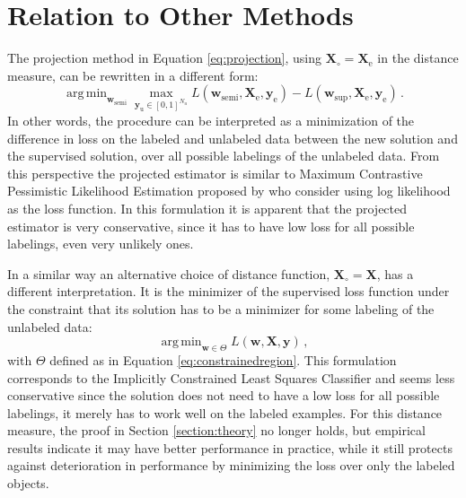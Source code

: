 \documentclass[twoside]{memoir}\usepackage[]{graphicx}\usepackage{xcolor}
\newcommand{\Xe}{\mathbf{X}_\mathrm{e}  }
\DeclareMathOperator*{\argmin}{arg\,min}
\renewcommand{\vec}{\mathbf}
\begin{document}
\section{Relation to Other Methods}
\label{section:interpretations}
The projection method in Equation \eqref{eq:projection}, using $\vec{X}_{\circ}=\Xe$ in the distance measure, can be rewritten in a different form:
\begin{equation}
\argmin_{\vec{w}_\text{semi}} \max_{\vec{y}_\text{u} \in [0,1]^{N_u}} L(\vec{w}_\text{semi},\Xe,\vec{y}_\text{e}) - L(\vec{w}_\text{sup},\Xe,\vec{y}_\text{e}) \,. \nonumber
\end{equation}
In other words, the procedure can be interpreted as a minimization of the difference in loss on the labeled and unlabeled data between the new solution and the supervised solution, over all possible labelings of the unlabeled data. From this perspective the projected estimator is similar to Maximum Contrastive Pessimistic Likelihood Estimation proposed by \citet{Loog2016} who consider using log likelihood as the loss function. In this formulation it is apparent that the projected estimator is very conservative, since it has to have low loss for all possible labelings, even very unlikely ones.

In a similar way an alternative choice of distance function, $\vec{X}_{\circ}=\vec{X}$, has a different interpretation. It is the minimizer of the supervised loss function under the constraint that its solution has to be a minimizer for some labeling of the unlabeled data:
\begin{equation}
\argmin_{\vec{w} \in \Theta} L(\vec{w},\vec{X},\vec{y}) \,, \nonumber
\end{equation}
with $\Theta$ defined as in Equation \eqref{eq:constrainedregion}. This formulation corresponds to the Implicitly Constrained Least Squares Classifier \citep{Krijthe2015} and seems less conservative since the solution does not need to have a low loss for all possible labelings, it merely has to work well on the labeled examples. For this distance measure, the proof in Section \ref{section:theory} no longer holds, but empirical results indicate it may have better performance in practice, while it still protects against deterioration in performance by minimizing the loss over only the labeled objects.
\end{document}
